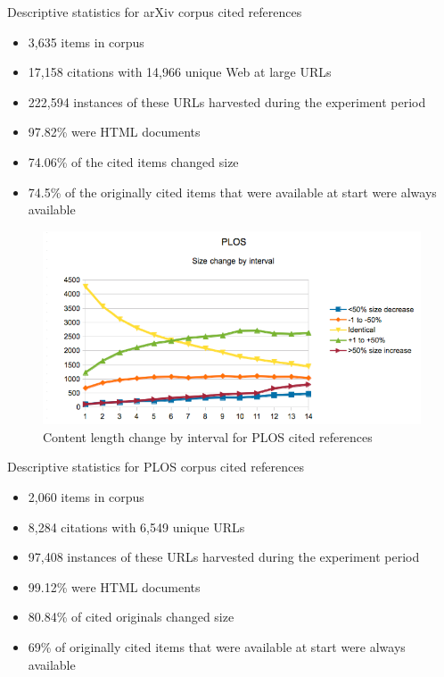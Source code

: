 \documentclass[12pt]{article}
\begin{document}
Descriptive statistics for arXiv corpus cited references 
\begin{itemize}
\item 3,635 items in corpus
\item 17,158 citations with 14,966 unique Web at large URLs
\item 222,594 instances of these URLs harvested during the experiment period
\item 97.82\% were HTML documents
\item 74.06\% of the cited items changed size
\item 74.5\% of the originally cited items that were available at start were always available
\end{itemize}

\begin{figure}[h!]
  \includegraphics[width=\linewidth,natwidth=610,natheight=642]{figure4.png}
  \caption{Content length change by interval for PLOS cited references}
  \label{fig:plosclchange}
\end{figure}

Descriptive statistics for PLOS corpus cited references
\begin{itemize}
\item 2,060 items in corpus
\item 8,284 citations with 6,549 unique URLs
\item 97,408 instances of these URLs harvested during the experiment period
\item 99.12\% were HTML documents 
\item 80.84\% of cited originals changed size
\item 69\% of originally cited items that were available at start were always available 
\end{itemize}
\end{document}
